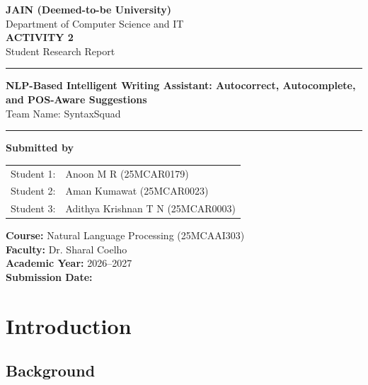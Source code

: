 \documentclass[12pt,a4paper]{report}
\begin{document}
\begin{titlepage}
\centering

{\Large \textbf{JAIN (Deemed-to-be University)}}\\[0.3cm]
{\large Department of Computer Science and IT}\\[1.5cm]

{\Huge \textbf{ACTIVITY 2}}\\[0.4cm]
{\Large Student Research Report}\\[1.2cm]

\hrule
\vspace{0.5cm}

{\LARGE \textbf{NLP-Based Intelligent Writing Assistant: Autocorrect, Autocomplete, and POS-Aware Suggestions}}\\[0.4cm]
{\large Team Name: SyntaxSquad}

\vspace{0.5cm}
\hrule
\vspace{1cm}

\textbf{Submitted by}\\[0.3cm]

\begin{tabular}{ll}
Student 1: & Anoon M R (25MCAR0179) \\
Student 2: & Aman Kumawat (25MCAR0023) \\
Student 3: & Adithya Krishnan T N (25MCAR0003) \\
\end{tabular}

\vfill

\textbf{Course:} Natural Language Processing (25MCAAI303)\\
\textbf{Faculty:} Dr. Sharal Coelho\\
\textbf{Academic Year:} 2026--2027\\[0.5cm]

\textbf{Submission Date:} \underline{\hspace{4.5cm}}

\end{titlepage}

\tableofcontents
\clearpage
{}

\chapter{Introduction}

\section{Background}
\end{document}
